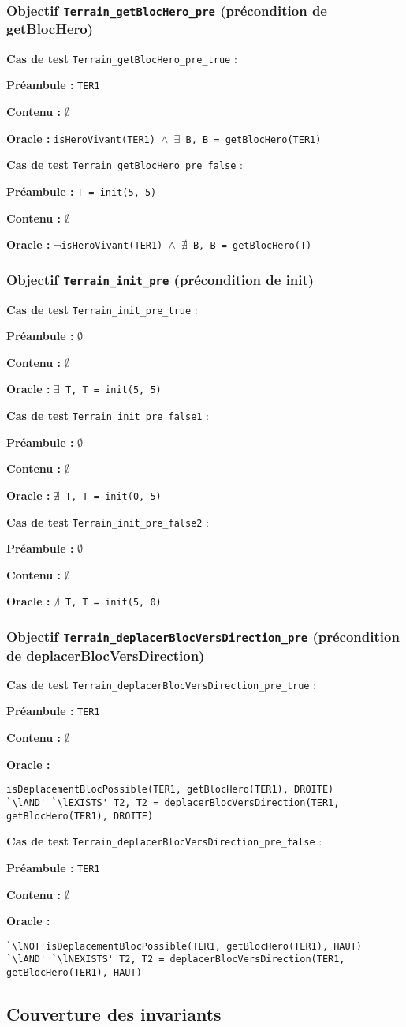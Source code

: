 \documentclass{article}
\newcommand{\cmd}[1]{\texttt{#1}}
\newcommand{\lAND}{$\land$}
\newcommand{\lNOT}{$\lnot$}
\newcommand{\lEXISTS}{$\exists$}
\newcommand{\lNEXISTS}{$\nexists{}$}
\newcommand{\obj}[2]{\subsubsection*{\large{\textbf{Objectif {\cmd{#1} (#2)}}}}}
\newenvironment{cas}[1]
{
	\hspace{1em}\textbf{Cas de test} \cmd{#1} :
	\begin{list}{}{}
}{
	\end{list}\vspace{1em}
}
\newcommand{\pre}[1]{\item \textbf{Préambule :} \cmd{#1}}
\newcommand{\npre}{\item \textbf{Préambule :} $\emptyset$}
\newcommand{\nope}{\item \textbf{Contenu :} $\emptyset$}
\newcommand{\ora}[1]{\item \textbf{Oracle :} \cmd{#1}}
\newcommand{\oram}{\item \textbf{Oracle :}}
\begin{document}
\obj{Terrain\_getBlocHero\_pre} {précondition de getBlocHero}
	\begin{cas} {Terrain\_getBlocHero\_pre\_true}
		\pre{TER1}
		\nope{}
		\ora{isHeroVivant(TER1) \lAND{} \lEXISTS{} B, B = getBlocHero(TER1)}
	\end{cas}

	\begin{cas} {Terrain\_getBlocHero\_pre\_false}
		\pre{T = init(5, 5)}
		\nope{}
		\ora{\lNOT{}isHeroVivant(TER1) \lAND{} \lNEXISTS{} B, B = getBlocHero(T)}
	\end{cas}

\obj{Terrain\_init\_pre} {précondition de init}
	\begin{cas} {Terrain\_init\_pre\_true}
		\npre{}
		\nope{}
		\ora{\lEXISTS{} T, T = init(5, 5)}
	\end{cas}

	\begin{cas} {Terrain\_init\_pre\_false1}
		\npre{}
		\nope{}
		\ora{\lNEXISTS{} T, T = init(0, 5)}
	\end{cas}

	\begin{cas} {Terrain\_init\_pre\_false2}
		\npre{}
		\nope{}
		\ora{\lNEXISTS{} T, T = init(5, 0)}
	\end{cas}

\obj{Terrain\_deplacerBlocVersDirection\_pre} {précondition de deplacerBlocVersDirection}
	\begin{cas} {Terrain\_deplacerBlocVersDirection\_pre\_true}
		\pre{TER1}
		\nope{}
		\oram{}
		\begin{lstlisting}
isDeplacementBlocPossible(TER1, getBlocHero(TER1), DROITE)
`\lAND' `\lEXISTS' T2, T2 = deplacerBlocVersDirection(TER1, getBlocHero(TER1), DROITE)
		\end{lstlisting}
	\end{cas}

	\begin{cas} {Terrain\_deplacerBlocVersDirection\_pre\_false}
		\pre{TER1}
		\nope{}
		\oram{}
		\begin{lstlisting}
`\lNOT'isDeplacementBlocPossible(TER1, getBlocHero(TER1), HAUT)
`\lAND' `\lNEXISTS' T2, T2 = deplacerBlocVersDirection(TER1, getBlocHero(TER1), HAUT)
		\end{lstlisting}
	\end{cas}

\subsection*{Couverture des invariants}
\end{document}
